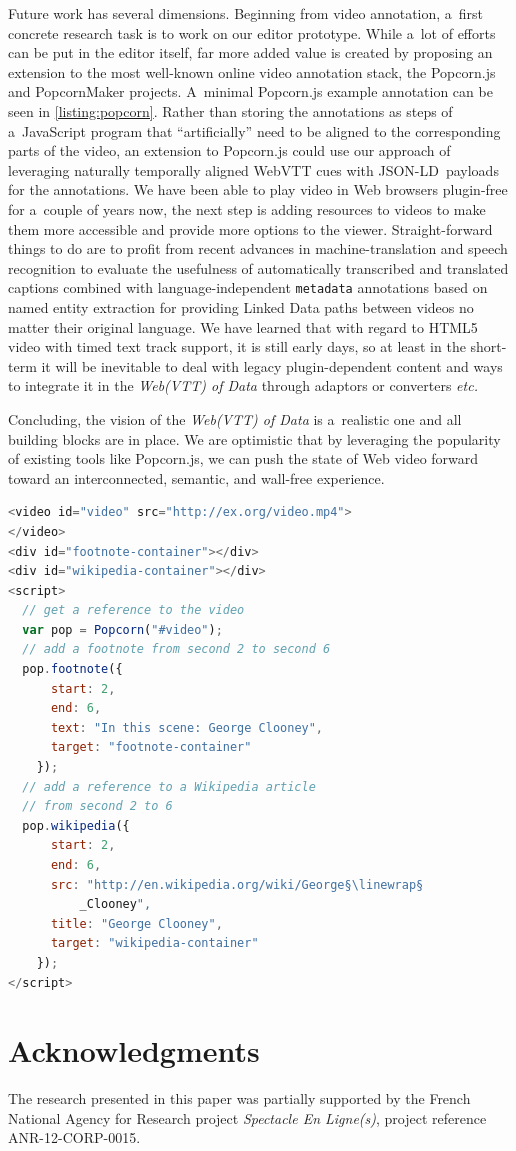 \documentclass{sig-alternate}
\newcommand{\linewrap}{\raisebox{-.6ex}{\textcolor{grey}{$\hookleftarrow$}}}
\def\JSONLD{\mbox{JSON-LD}}
\begin{document}
Future work has several dimensions.
Beginning from video annotation, a~first concrete research task
is to work on our editor prototype.
While a~lot of efforts can be put in the editor itself,
far more added value is created by proposing an extension to the
most well-known online video annotation stack, the Popcorn.js 
and PopcornMaker projects.
A~minimal Popcorn.js example annotation can be seen in \autoref{listing:popcorn}.
Rather than storing the annotations as steps of a~JavaScript program
that ``artificially'' need to be aligned to the corresponding parts of the video,
an extension to Popcorn.js could use our approach of leveraging
naturally temporally aligned WebVTT cues with \JSONLD\ payloads for the annotations.
We have been able to play video in Web browsers plugin-free
for a~couple of years now, the next step is adding resources to videos
to make them more accessible and provide more options to the viewer.
Straight-forward things to do are to profit from recent advances
in machine-translation and speech recognition
to evaluate the usefulness of automatically
transcribed and translated captions combined with language-independent \texttt{metadata}
annotations based on named entity extraction for providing Linked Data
paths between videos no matter their original language.
We have learned that with regard to HTML5 video with timed text track support,
it is still early days, so at least in the short-term
it will be inevitable to deal with legacy plugin-dependent content
and ways to integrate it in the \emph{Web(VTT) of Data}
through adaptors or converters \emph{etc.}

Concluding, the vision of the \emph{Web(VTT) of Data} is a~realistic one
and all building blocks are in place.
We are optimistic that by leveraging the popularity
of existing tools like Popcorn.js, we can push the state of Web video forward
toward an interconnected, semantic, and wall-free experience.  

\begin{lstlisting}[caption={Popcorn.js example},
  label=listing:popcorn, float=h!, language=JavaScript]
<video id="video" src="http://ex.org/video.mp4">
</video>
<div id="footnote-container"></div>
<div id="wikipedia-container"></div>
<script>
  // get a reference to the video
  var pop = Popcorn("#video");
  // add a footnote from second 2 to second 6
  pop.footnote({
      start: 2,
      end: 6,
      text: "In this scene: George Clooney",
      target: "footnote-container"
    });
  // add a reference to a Wikipedia article
  // from second 2 to 6  
  pop.wikipedia({
      start: 2,
      end: 6,
      src: "http://en.wikipedia.org/wiki/George§\linewrap§
          _Clooney",
      title: "George Clooney",
      target: "wikipedia-container"
    });    
</script>
\end{lstlisting}

\section*{Acknowledgments}

{\footnotesize The research presented in this paper was partially supported
by the French National Agency for Research  project
\emph{Spectacle En Ligne(s)}, project reference
\mbox{ANR-12-CORP-0015}.}



\end{document}
